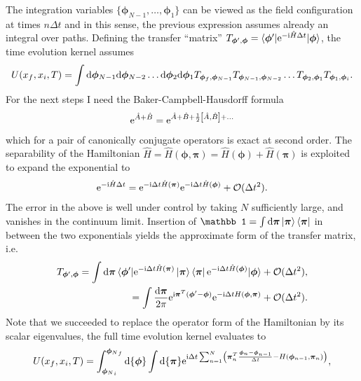 The integration variables $\{{\bm\phi}_{N-1},\dots,{\bm\phi}_1\}$ can be viewed as the field configuration at times $n\Delta t$ and in this sense, the previous expression assumes already an integral over paths.
Defining the transfer ``matrix'' $T_{{\bm\phi}',{\bm\phi}}=\braket{{\bm\phi}'|\mathrm e^{-\mathrm i\hat H\Delta t}|{\bm\phi}}$, the time evolution kernel assumes
\begin{align}
    U(x_f,x_i,T) =
    \int{\mathrm d{\bm\phi}_{N-1}\mathrm d{\bm\phi}_{N-2}\dots\mathrm d{\bm\phi}_2\mathrm d{\bm\phi}_1}
    T_{{\bm\phi}_f,{\bm\phi}_{{N-1}}}
    T_{{\bm\phi}_{{N-1}},{\bm\phi}_{{N-2}}}
    \dots
    T_{{\bm\phi}_{{2}},{\bm\phi}_{{1}}}
    T_{{\bm\phi}_{{1}},{\bm\phi}_i}.
\end{align}
For the next steps I need the Baker-Campbell-Hausdorff formula
\begin{align}
    \mathrm e^{\hat A+\hat B} = \mathrm e^{\hat A + \hat B + \frac12\left[ \hat A, \hat B \right]+\dots}
\end{align}
which for a pair of canonically conjugate operators is exact at second order.
The separability of the Hamiltonian $\hat H = \hat H(\bm\phi,\bm\pi) = \hat H(\bm\phi)+\hat H(\bm\pi)$ is exploited to expand the exponential to
\begin{align}
    \mathrm e^{-\mathrm i\hat H\Delta t}
    = \mathrm e^{-\mathrm i\Delta t\hat H(\bm\pi)}\mathrm e^{-\mathrm i\Delta t\hat H(\bm\phi)}+\mathcal O(\Delta t^2).
\end{align}
The error in the above is well under control by taking $N$ sufficiently large, and vanishes in the continuum limit.
Insertion of $\mathbb1=\int\rd\bm\pi\ket{\bm\pi}\bra{\bm\pi}$ in between the two exponentials yields the approximate form of the transfer matrix, i.e.
\begin{align}
    T_{{\bm\phi}',{\bm\phi}} =
    \int\mathrm d\bm\pi
    \braket{{\bm\phi}'|\mathrm e^{-\mathrm i\Delta t\hat H(\bm\pi)}\ket{\bm\pi}\bra{\bm\pi}\mathrm e^{-\mathrm i\Delta t\hat H(\bm\phi)}|{\bm\phi}} + \mathcal O(\Delta t^2),
    \\
    =
    \int\frac{\mathrm d\bm\pi}{2\pi}\mathrm e^{\mathrm i\bm\pi^T(\bm\phi'-\bm\phi)}\mathrm e^{-\mathrm i\Delta t H(\bm\phi,\bm\pi)} + \mathcal O(\Delta t^2).
\end{align}
Note that we succeeded to replace the operator form of the Hamiltonian by its scalar eigenvalues, the full time evolution kernel evaluates to
\begin{align}
    U(x_f,x_i,T) =
    \int_{{\bm\phi_N}_i}^{{\bm\phi_N}_f}
    {\mathrm d\{\bm\phi\}}\int{\mathrm d\{\bm\pi\}}
    \mathrm e^{\mathrm i\Delta t\sum_{n=1}^{N}\left( \bm\pi_n^T\frac{\bm\phi_{n}-\bm\phi_{n-1}}{\Delta t}-H(\bm\phi_{n-1},\bm\pi_n) \right)},
    \label{eq:path_integral_pre_integration}
\end{align}
